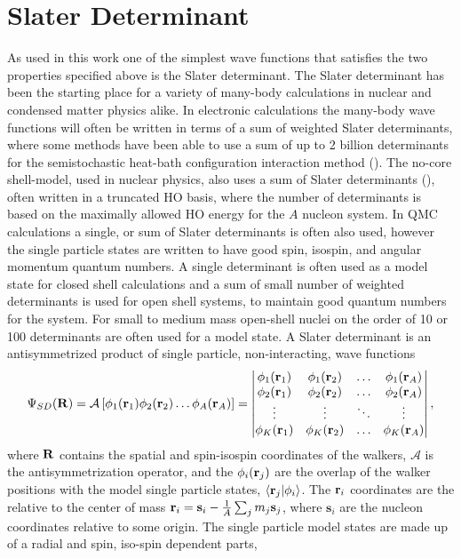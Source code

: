 \section{Slater Determinant}
As used in this work one of the simplest wave functions that satisfies the two properties specified above is the Slater determinant. The Slater determinant has been the starting place for a variety of many-body calculations in nuclear and condensed matter physics alike. In electronic calculations the many-body wave functions will often be written in terms of a sum of weighted Slater determinants, where some methods have been able to use a sum of up to 2 billion determinants for the semistochastic heat-bath configuration interaction method (\cite{huron1973,li2018}). The no-core shell-model, used in nuclear physics, also uses a sum of Slater determinants (\cite{navratil2009,barrett2013}), often written in a truncated HO basis, where the number of determinants is based on the maximally allowed HO energy for the $A$ nucleon system. In QMC calculations a single, or sum of Slater determinants is often also used, however the single particle states are written to have good spin, isospin, and angular momentum quantum numbers. A single determinant is often used as a model state for closed shell calculations and a sum of small number of weighted determinants is used for open shell systems, to maintain good quantum numbers for the system. For small to medium mass open-shell nuclei on the order of 10 or 100 determinants are often used for a model state. A Slater determinant is an antisymmetrized product of single particle, non-interacting, wave functions
\begin{equation}
   \Psi_{SD}(\mathbf{R}) = \mathcal{A} \left[\phi_1(\mathbf{r}_1)\phi_2(\mathbf{r}_2) \ldots \phi_A(\mathbf{r}_A)\right] =
   \begin{vmatrix}
      \phi_1(\mathbf{r}_1) & \phi_1(\mathbf{r}_2) & \ldots & \phi_1(\mathbf{r}_A) \\
      \phi_2(\mathbf{r}_1) & \phi_2(\mathbf{r}_2) & \ldots & \phi_2(\mathbf{r}_A) \\
      \vdots & \vdots & \ddots & \vdots \\
      \phi_K(\mathbf{r}_1) & \phi_K(\mathbf{r}_2) & \ldots & \phi_K(\mathbf{r}_A) \\
   \end{vmatrix},
\end{equation}
where $\mathbf{R}$ contains the spatial and spin-isospin coordinates of the walkers, $\mathcal{A}$ is the antisymmetrization operator, and the $\phi_i(\mathbf{r}_j)$ are the overlap of the walker positions with the model single particle states, $\left< \mathbf{r}_j | \phi_i \right>$. The $\mathbf{r}_i$ coordinates are the relative to the center of mass $\mathbf{r}_i = \mathbf{s}_i - \frac{1}{A}\sum_jm_j\mathbf{s}_j$, where $\mathbf{s}_i$ are the nucleon coordinates relative to some origin. The single particle model states are made up of a radial and spin, iso-spin dependent parts,
